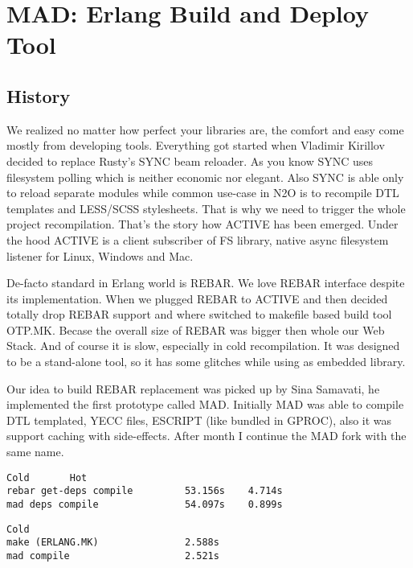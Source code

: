 \section{MAD: Erlang Build and Deploy Tool}

\subsection{History}

We realized no matter how perfect your libraries are,
the comfort and easy come mostly from developing tools.
Everything got started when Vladimir Kirillov decided to
replace Rusty's SYNC beam reloader. As you know SYNC uses
filesystem polling which is neither economic nor elegant. Also
SYNC is able only to reload separate modules while
common use-case in N2O is to recompile DTL templates
and LESS/SCSS stylesheets. That is why we need to trigger
the whole project recompilation. That's the story how ACTIVE
has been emerged. Under the hood ACTIVE is a client subscriber
of FS library, native async filesystem listener
for Linux, Windows and Mac.

De-facto standard in Erlang world is REBAR.
We love REBAR interface despite its implementation.
When we plugged REBAR to ACTIVE and then decided totally
drop REBAR support and where switched to makefile
based build tool OTP.MK. Becase the overall size
of REBAR was bigger then whole our Web Stack.
And of course it is slow, especially in cold recompilation.
It was designed to be a stand-alone tool, so it has some
glitches while using as embedded library.

Our idea to build REBAR replacement was picked up by Sina Samavati,
he implemented the first prototype called MAD. Initially MAD
was able to compile DTL templated, YECC files, ESCRIPT (like
bundled in GPROC), also it was support caching with side-effects.
After month I continue the MAD fork with the same name.

\vspace{1\baselineskip}
\begin{lstlisting}[caption=Example of building N2O sample]
                               Cold       Hot
rebar get-deps compile         53.156s    4.714s
mad deps compile               54.097s    0.899s
\end{lstlisting}
\vspace{1\baselineskip}

\vspace{1\baselineskip}
\begin{lstlisting}[caption=Example of building Cowboy]
                               Cold
make (ERLANG.MK)               2.588s
mad compile                    2.521s
\end{lstlisting}
\vspace{1\baselineskip}

